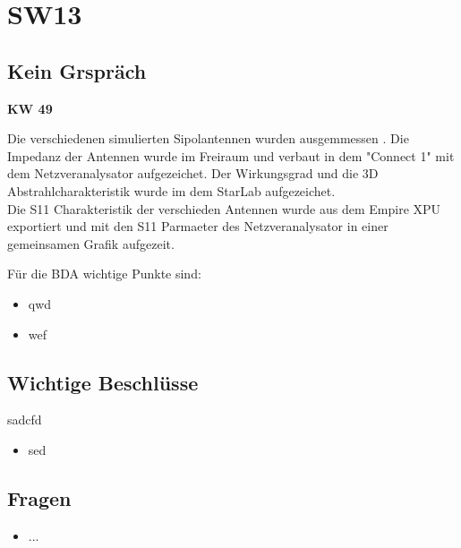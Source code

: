 \documentclass[10pt,a4paper]{article}
\begin{document}
\section*{SW13}


\subsection*{Kein Grspräch}

\textbf{KW 49}


Die verschiedenen simulierten Sipolantennen wurden ausgemmessen . Die Impedanz der Antennen wurde im Freiraum und verbaut in dem "Connect 1" mit dem Netzveranalysator aufgezeichet. Der Wirkungsgrad und die 3D Abstrahlcharakteristik wurde im dem StarLab aufgezeichet.\\
Die S11 Charakteristik der verschieden Antennen wurde aus dem Empire XPU exportiert und mit den S11 Parmaeter des Netzveranalysator in einer gemeinsamen Grafik aufgezeit.

\vspace{10 mm}
Für die BDA wichtige Punkte sind:
\begin{itemize}
	\item qwd
	\item wef
	
\end{itemize}

\subsection*{Wichtige Beschlüsse}
sadcfd
\begin{itemize}
	\item sed
\end{itemize}
\subsection*{Fragen}
\begin{itemize}
	\item ...
\end{itemize}
\end{document}
